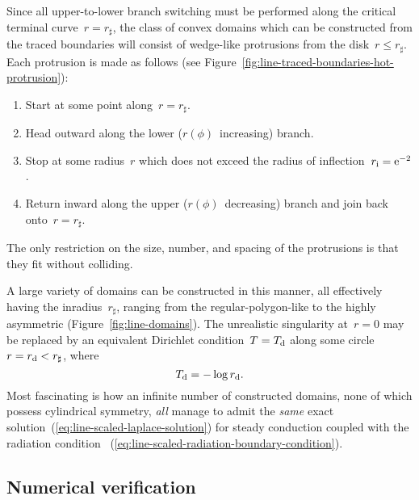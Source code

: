 \begin{figure}
\end{figure}

Since all upper-to-lower branch switching must be performed
along the critical terminal curve~$r = r_\sharp$,
the class of convex domains which can be constructed
from the traced boundaries
will consist of wedge-like protrusions from the disk~$r \le r_\sharp$.
Each protrusion is made as follows
(see Figure~\ref{fig:line-traced-boundaries-hot-protrusion}):
\begin{enumerate}
  \item
    Start at some point along~$r = r_\sharp$.
  \item
    Head outward along the lower ($r (\phi)$~increasing) branch.
  \item
    Stop at some radius~$r$ which does not exceed
    the radius of inflection~$r_{\mathrm{i}} = \mathrm{e}^{-2}$.
  \item
    Return inward along the upper ($r (\phi)$~decreasing) branch
    and join back onto~$r = r_\sharp$.
\end{enumerate}
The only restriction on the size, number, and spacing of the protrusions
is that they fit without colliding.

A large variety of domains can be constructed in this manner,
all effectively having the inradius~$r_\sharp$,
ranging from the regular-polygon-like to the highly asymmetric
(Figure~\ref{fig:line-domains}).
The unrealistic singularity at~$r = 0$
may be replaced by an equivalent Dirichlet condition~$T = T_{\mathrm{d}}$
along some circle~$r = r_{\mathrm{d}} < r_\sharp$,
where
\begin{equation}
  T_{\mathrm{d}} = -\log r_{\mathrm{d}}.
  \label{eq:line-scaled-equivalent-dirichlet-relation}
\end{equation}
Most fascinating is how an infinite number of constructed domains,
none of which possess cylindrical symmetry,
\emph{all} manage to admit
the \emph{same} exact solution~(\ref{eq:line-scaled-laplace-solution})
for steady conduction coupled with the radiation condition~%
  (\ref{eq:line-scaled-radiation-boundary-condition}).

\subsection{Numerical verification}
\label{sec:polar.convex.verification}

